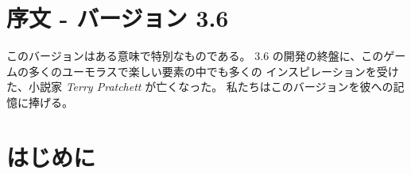 \maketitle

\section{序文 - バージョン 3.6}
このバージョンはある意味で特別なものである。
3.6 の開発の終盤に、このゲームの多くのユーモラスで楽しい要素の中でも多くの
インスピレーションを受けた、小説家 {\it Terry Pratchett} が亡くなった。
私たちはこのバージョンを彼への記憶に捧げる。

\section{はじめに}


